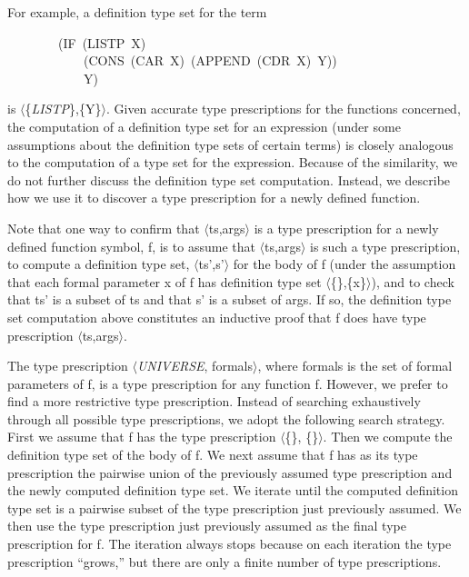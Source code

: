 \documentclass[10pt]{book}
\newenvironment{pubasis}{\begin{flushleft}}{\end{flushleft}}
\begin{document}
For example, a definition type set for the term
\begin{pubasis}
~~~~~~~~(IF~(LISTP~X)\\
~~~~~~~~~~~~(CONS~(CAR~X)~(APPEND~(CDR~X)~Y))\\
~~~~~~~~~~~~Y)\\
\end{pubasis}
is $\langle$\{\emph{LISTP}\},\{Y\}$\rangle$.  Given accurate type prescriptions for
the functions concerned, the computation of a definition type set
for an expression (under some assumptions about the definition type sets
of certain terms) is closely analogous to the computation of a type
set for the expression.  Because of the similarity, we do not
further discuss the definition type set computation.  Instead,
we describe how we use it to discover a type prescription for a newly
defined function.

Note that one way to confirm that $\langle$ts,args$\rangle$ is a type prescription for a
newly defined function symbol, f, is to assume that $\langle$ts,args$\rangle$ is such
a type prescription, to compute a definition type set, $\langle$ts',s'$\rangle$ for the body
of f (under the assumption that each formal parameter x of f has definition
type set $\langle$\{\},\{x\}$\rangle$), and to check that ts' is a subset of
ts and that s' is a subset of args.  If so, the definition type
set computation above  constitutes an
inductive proof that f does have type prescription
$\langle$ts,args$\rangle$.  

The type prescription
$\langle$\emph{UNIVERSE}, formals$\rangle$, where formals is the set of formal
parameters of f, is a type prescription for any function f.
However, we prefer to find
a more restrictive type prescription.  Instead of
searching exhaustively through all possible
type prescriptions, we adopt the following
search strategy.  First we assume that
f has the type prescription $\langle$\{\}, \{\}$\rangle$. 
Then we compute the definition type set
of the body of f.  We next assume that f has
as its type prescription  the
pairwise union of the previously assumed type prescription and the newly computed
definition type set.  We iterate until
the computed definition type set is
a pairwise subset of the type prescription just previously assumed.
We then use the type prescription just previously assumed
as the final type prescription for f.
The iteration always stops because on each
iteration the type prescription ``grows,'' but
there are only a finite number of type prescriptions.
\end{document}
